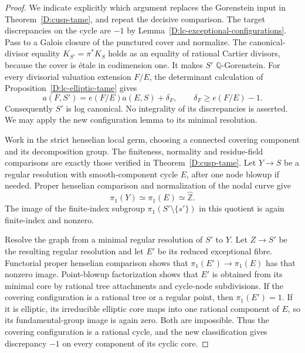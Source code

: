 \begin{proof}
We indicate explicitly which argument replaces the
Gorenstein input in Theorem~\ref{D:cusp-tame}, and
repeat the decisive comparison.
The target discrepancies on the cycle are $-1$ by
Lemma~\ref{D:lc-exceptional-configurations}.
Pass to a Galois closure of the punctured cover
and normalize.  The canonical-divisor equality
$K_{S'}=\pi^*K_S$ holds as an equality of rational
Cartier divisors, because the cover is \'etale
in codimension one.  It makes $S'$
$\mathbb Q$-Gorenstein.  For every divisorial
valuation extension $F/E$, the determinant
calculation of Proposition~\ref{D:lc-elliptic-tame}
gives
\[
 a(F,S')=e(F/E)a(E,S)+\delta_F,
 \qquad \delta_F\geq e(F/E)-1.
\]
Consequently $S'$ is log canonical.  No
integrality of its discrepancies is asserted.
We may apply the new configuration lemma to
its minimal resolution.

Work in the strict henselian local germ, choosing
a connected covering component and its decomposition
group.  The finiteness, normality and residue-field
comparisons are exactly those verified in
Theorem~\ref{D:cusp-tame}.  Let $Y\to S$ be a
regular resolution with smooth-component cycle
$E$, after one node blowup if needed.
Proper henselian comparison
\cite[Lemma 58.9.1, tag 0A48]{StacksBCuspLocal}
and normalization of the nodal curve give
\[
 \pi_1(Y)\simeq\pi_1(E)
       \simeq\widehat{\mathbb Z}.
\]
The image of the finite-index subgroup
$\pi_1(S'\setminus\{s'\})$ in this quotient
is again finite-index and nonzero.

Resolve the graph from a minimal regular resolution
of $S'$ to $Y$.  Let $Z\to S'$ be the resulting
regular resolution and let $E'$ be its reduced
exceptional fibre.  Functorial proper henselian
comparison shows that $\pi_1(E')\to\pi_1(E)$
has that nonzero image.  Point-blowup factorization
shows that $E'$ is obtained from its minimal core
by rational tree attachments and cycle-node
subdivisions.
If the covering configuration is a rational tree
or a regular point, then $\pi_1(E')=1$.
If it is elliptic, its irreducible elliptic core
maps into one rational component of $E$, so
its fundamental-group image is again zero.
Both are impossible.  Thus the covering
configuration is a rational cycle, and the
new classification gives discrepancy $-1$
on every component of its cyclic core.


\end{proof}
